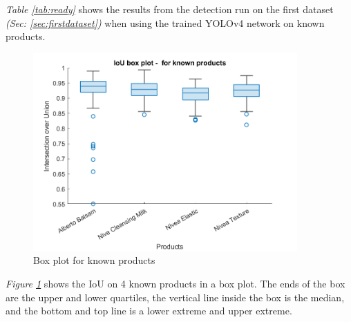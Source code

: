 \begin{table}[h]
\caption{Detection results when tested on trained data}
\label{tab:ready}
\end{table}
\textit{Table \ref{tab:ready}} shows the results from the detection run on the first dataset \textit{(Sec: \ref{sec:firstdataset})} when using the trained YOLOv4 network on known products.

\begin{figure}[h]
    \centering
    \includegraphics[width=0.9\textwidth]{graphics/results/boxplotForKnownProducts.png}
    \caption{Box plot for known products}
    \label{fig:boxknownproducts}
\end{figure}
\textit{Figure \ref{fig:boxknownproducts}} shows the IoU on 4 known products in a box plot. The ends of the box are the upper and lower quartiles,  the vertical line inside the box is the median, and the bottom and top line is a lower extreme and upper extreme.



